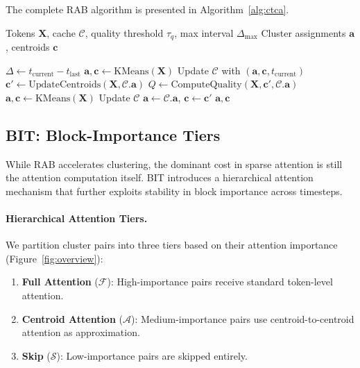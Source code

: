 The complete RAB algorithm is presented in Algorithm~\ref{alg:ctca}.

\begin{algorithm}[t]
\caption{RAB: Reuse-Across-Blocks}
\label{alg:ctca}
\begin{algorithmic}[1]
\REQUIRE Tokens $\mathbf{X}$, cache $\mathcal{C}$, quality threshold $\tau_q$, max interval $\Delta_{\max}$
\ENSURE Cluster assignments $\mathbf{a}$, centroids $\mathbf{c}$

\STATE $\Delta \gets t_{\text{current}} - t_{\text{last}}$
    \STATE $\mathbf{a}, \mathbf{c} \gets \text{KMeans}(\mathbf{X})$ 
    \STATE Update $\mathcal{C}$ with $(\mathbf{a}, \mathbf{c}, t_{\text{current}})$
\ELSE
    \STATE $\mathbf{c}' \gets \text{UpdateCentroids}(\mathbf{X}, \mathcal{C}.\mathbf{a})$
    \STATE $Q \gets \text{ComputeQuality}(\mathbf{X}, \mathbf{c}', \mathcal{C}.\mathbf{a})$
        \STATE $\mathbf{a}, \mathbf{c} \gets \text{KMeans}(\mathbf{X})$ 
        \STATE Update $\mathcal{C}$
    \ELSE
        \STATE $\mathbf{a} \gets \mathcal{C}.\mathbf{a}$, $\mathbf{c} \gets \mathbf{c}'$ 
    \ENDIF
\ENDIF
\RETURN $\mathbf{a}, \mathbf{c}$
\end{algorithmic}
\end{algorithm}

\subsection{BIT: Block-Importance Tiers}
\label{sec:ctaa}

While RAB accelerates clustering, the dominant cost in sparse attention is still the attention computation itself. BIT introduces a hierarchical attention mechanism that further exploits stability in block importance across timesteps.

\paragraph{Hierarchical Attention Tiers.}
We partition cluster pairs into three tiers based on their attention importance (Figure~\ref{fig:overview}):

\begin{enumerate}
    \item \textbf{Full Attention} ($\mathcal{F}$): High-importance pairs receive standard token-level attention.
    \item \textbf{Centroid Attention} ($\mathcal{A}$): Medium-importance pairs use centroid-to-centroid attention as approximation.
    \item \textbf{Skip} ($\mathcal{S}$): Low-importance pairs are skipped entirely.
\end{enumerate}

